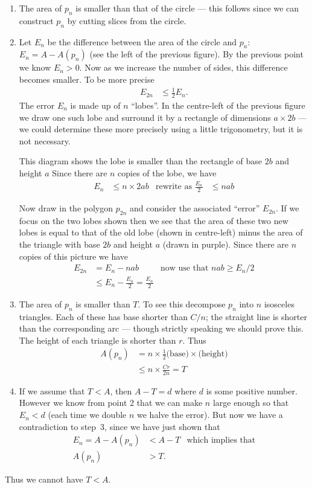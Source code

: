 \begin{enumerate}
 \item The area of $p_n$ is smaller than that of the circle --- this follows since we can
construct $p_n$ by cutting slices from the circle.
 \item Let $E_n$ be the difference between the area of the circle and $p_n$: $E_n = A -
A(p_n)$ (see the left of the previous figure). By the previous point we know $E_n>0$.
Now as we increase the number of sides, this difference becomes smaller. To be more
precise
  \begin{align*}
  E_{2n} & \leq \frac{1}{2} E_n.
  \end{align*}
The error $E_n$ is made up of $n$ ``lobes''. In the centre-left of the previous figure we
draw one such lobe and surround it by a rectangle of dimensions $a \times 2b$ --- we
could determine these more precisely using a little trigonometry, but it is not necessary.

This diagram shows the lobe is smaller than the rectangle of base $2b$ and height $a$
Since there are $n$ copies of the lobe, we have
\begin{align*}
  E_n & \leq n  \times 2ab & \text{rewrite as } \frac{E_n}{2} & \leq nab
\end{align*}

Now draw in the polygon $p_{2n}$ and consider the associated ``error'' $E_{2n}$. If we
focus on the two lobes shown then we see that the area of these two new lobes is equal to
that of the old lobe (shown in centre-left) minus the area of the triangle with base $2b$
and height $a$ (drawn in purple). Since there are $n$ copies of this
picture we have
\begin{align*}
  E_{2n} &= E_n - nab & \text{now use that $nab \geq  E_n/2$} \\
  & \leq E_n - \frac{E_n}{2} = \frac{E_n}{2}
\end{align*}

\item The area of $p_n$ is smaller than $T$. To see this decompose $p_n$ into $n$
isosceles triangles. Each of these has base shorter than $C/n$; the straight line is
shorter than the corresponding arc --- though strictly speaking we should prove this. The
height of each triangle is shorter than $r$. Thus
\begin{align*}
  A(p_n) &= n \times \frac{1}{2} \text{(base)}\times \text{(height)} \\
  & \leq n \times \frac{Cr}{2n} = T
\end{align*}

\item If we assume that $T<A$, then $A-T = d$ where $d$ is some positive number.
However we know from point 2 that we can make $n$ large enough so that $E_n < d$
(each time we double $n$ we halve the error). But now we have a contradiction to
step~3, since we have just shown that
\begin{align*}
  E_n = A-A(p_n) & < A-T & \text{which implies that}\\
  A(p_n) & > T.
\end{align*}
\end{enumerate}
Thus we cannot have $T<A$.

